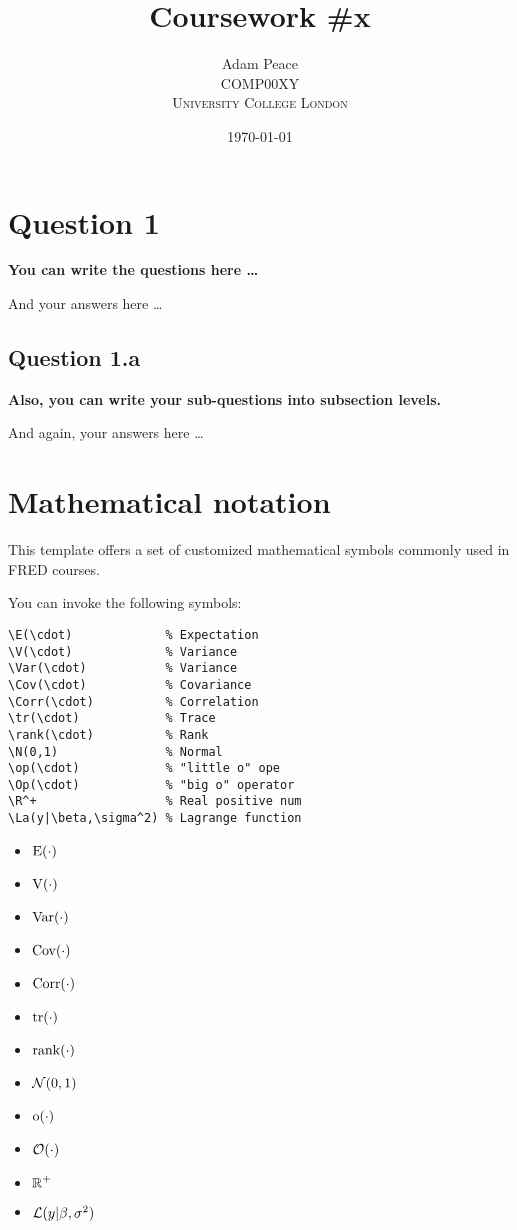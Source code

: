 \documentclass[12pt]{article}
\title{Coursework \#x} %
\author{Adam Peace\\ %
COMP00XY\\ %
\textsc{University College London}
}
\date{\today} %
\begin{document}
\setlength{\droptitle}{-5em}    
\maketitle


\section*{Question 1}
{\bfseries You can write the questions here \ldots}

And your answers here \ldots

\subsection*{Question 1.a}
{\bfseries Also, you can write your sub-questions into subsection levels.}

And again, your answers here \ldots

\section*{Mathematical notation}

This template offers a set of customized mathematical symbols commonly used in FRED courses.

\begin{multicols}{2}
You can invoke the following symbols:
\begin{Verbatim}[frame=single, fontsize=\footnotesize]
\E(\cdot)             % Expectation
\V(\cdot)             % Variance
\Var(\cdot)           % Variance
\Cov(\cdot)           % Covariance
\Corr(\cdot)          % Correlation
\tr(\cdot)            % Trace
\rank(\cdot)          % Rank
\N(0,1)               % Normal
\op(\cdot)            % "little o" ope
\Op(\cdot)            % "big o" operator
\R^+                  % Real positive num
\La(y|\beta,\sigma^2) % Lagrange function
\end{Verbatim}
\footnotesize{
\begin{itemize}  \setlength\itemsep{0em}
    \item $\operatorname{\mathrm{E}}(\cdot)$
    \item $\operatorname{\mathrm{V}}(\cdot)$
    \item $\operatorname{\mathrm{Var}}(\cdot)$
    \item $\operatorname*{Cov}(\cdot)$
    \item $\operatorname{\mathrm{Corr}}(\cdot)$
    \item $\operatorname{\mathrm{tr}}(\cdot)$
    \item $\operatorname{rank}(\cdot)$
    \item $\operatorname{\mathcal{N}}(0,1)$
    \item $\operatorname{\mathrm{o}}(\cdot)$
    \item $\operatorname{\mathcal{O}}(\cdot)$
    \item $\operatorname{\mathbb{R}}^{+}$
    \item $\operatorname{\mathcal{L}}(y|\beta,\sigma^2)$
\end{itemize}}
\end{multicols}
\end{document}
